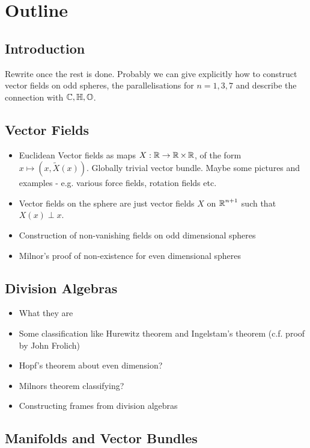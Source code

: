\section{Outline}

\subsection{Introduction}

Rewrite once the rest is done. Probably we can give explicitly how to construct vector fields on odd spheres, the parallelisations for $n=1,3,7$ and describe the connection with $\operatorname{\mathbb{C}}, \operatorname{\mathbb{H}}, \operatorname{\mathbb{O}}$.

\subsection{Vector Fields}

\begin{itemize}
\item Euclidean Vector fields as maps \(X : \operatorname{\mathbb{R}} \to \operatorname{\mathbb{R}} \times \operatorname{\mathbb{R}}\), of the form \(x \mapsto (x, \tilde{X}(x))\). Globally trivial vector bundle. Maybe some pictures and examples - e.g. various force fields, rotation fields etc.
\item Vector fields on the sphere are just vector fields \(X\) on \(\operatorname{\mathbb{R}}^{n+1}\) such that \(X(x) \perp x\).
\item Construction of non-vanishing fields on odd dimensional spheres
\item Milnor's proof of non-existence for even dimensional spheres
\end{itemize}

\subsection{Division Algebras}

\begin{itemize}
\item What they are
\item Some classification like Hurewitz theorem and Ingelstam's theorem (c.f. proof by John Frolich)
\item Hopf's theorem about even dimension?
\item Milnors theorem classifying?
\item Constructing frames from division algebras
\end{itemize}

\subsection{Manifolds and Vector Bundles}

